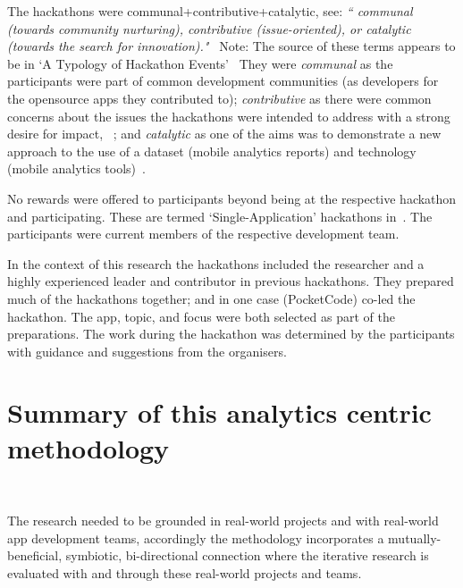 The hackathons were communal+contributive+catalytic, see: \emph{`` communal (towards  community  nurturing), contributive  (issue-oriented),  or  catalytic  (towards  the search  for  innovation)."}~\citep[p.3]{medina2020_what_do_we_know_about_hackathons_etc_a_SLR} Note: The source of these terms appears to be in `A Typology of Hackathon Events'~\citep[pp1-3]{drouhard2016_typology_of_hackathon_events} %
They were \emph{communal} as the participants were part of common development communities (as developers for the opensource apps they contributed to); \emph{contributive} as there were common concerns about the issues the hackathons were intended to address with a strong desire for impact, ~\citep[see p.2]{drouhard2016_typology_of_hackathon_events}; and \emph{catalytic} as one of the aims was to demonstrate a new approach to the use of a dataset (mobile analytics reports) and technology (mobile analytics tools)~\citep[see p.3]{drouhard2016_typology_of_hackathon_events}.

No rewards were offered to participants beyond being at the respective hackathon and participating. These are termed `Single-Application' hackathons in~\citealt[p.5]{briscoe2014_digital_innovation_the_hackathon_phenomenon}. The participants were current members of the respective development team.

In the context of this research the hackathons included the researcher and a highly experienced leader and contributor in previous hackathons. They prepared much of the hackathons together; and in one case (PocketCode) co-led the hackathon. The app, topic, and focus were both selected as part of the preparations. The work during the hackathon was determined by the participants with guidance and suggestions from the organisers.


\dotfill 

\section{Summary of this analytics centric methodology}~\label{analytics-centric-methodology-section}

The research needed to be grounded in real-world projects and with real-world app development teams, accordingly the methodology incorporates a mutually-beneficial, symbiotic, bi-directional connection where the iterative research is evaluated with and through these real-world projects and teams. 

